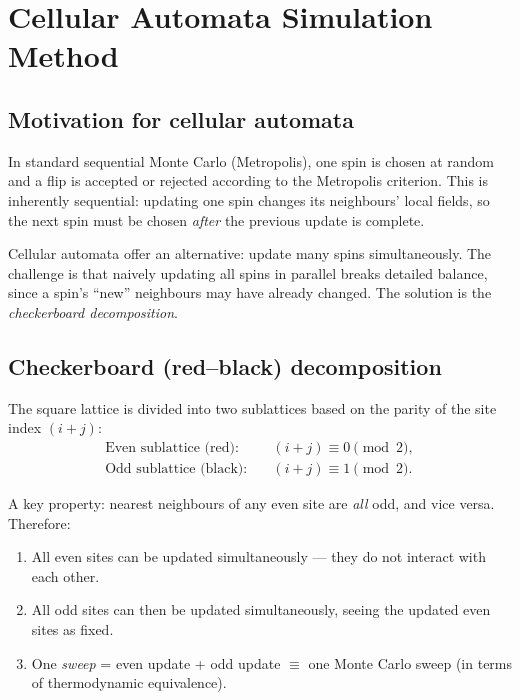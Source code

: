 \documentclass[11pt,a4paper]{article}
\begin{document}
\section{Cellular Automata Simulation Method}
\label{sec:ca}

\subsection{Motivation for cellular automata}

In standard sequential Monte Carlo (Metropolis), one spin is chosen at
random and a flip is accepted or rejected according to the Metropolis criterion.
This is inherently sequential: updating one spin changes its neighbours'
local fields, so the next spin must be chosen \emph{after} the previous
update is complete.

Cellular automata offer an alternative: update many spins simultaneously.
The challenge is that naively updating all spins in parallel breaks detailed
balance, since a spin's ``new'' neighbours may have already changed.
The solution is the \emph{checkerboard decomposition}.

\subsection{Checkerboard (red--black) decomposition}

The square lattice is divided into two sublattices based on the parity of
the site index $(i + j)$:
\begin{align}
  \text{Even sublattice (red):} &\quad (i+j) \equiv 0 \pmod{2}, \\
  \text{Odd sublattice (black):} &\quad (i+j) \equiv 1 \pmod{2}.
\end{align}

A key property: nearest neighbours of any even site are \emph{all} odd,
and vice versa. Therefore:
\begin{enumerate}[leftmargin=1.5em]
  \item All even sites can be updated simultaneously --- they do not
    interact with each other.
  \item All odd sites can then be updated simultaneously, seeing the
    updated even sites as fixed.
  \item One \emph{sweep} = even update + odd update $\equiv$ one
    Monte Carlo sweep (in terms of thermodynamic equivalence).
\end{enumerate}
\end{document}
